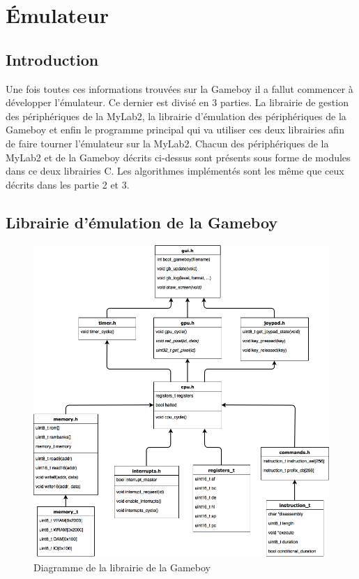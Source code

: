 \documentclass[a4paper]{article}
\begin{document}
\section{Émulateur}
\subsection{Introduction}
Une fois toutes ces informations trouvées sur la Gameboy il a fallut commencer
à développer l'émulateur. Ce dernier est divisé en 3 parties. La librairie de gestion
des périphériques de la MyLab2, la librairie d'émulation des périphériques de la Gameboy
et enfin le programme principal qui va utiliser ces deux librairies afin de faire
tourner l'émulateur sur la MyLab2. Chacun des périphériques de la MyLab2 et de la
Gameboy décrits  ci-dessus sont présents sous forme de modules dans ce deux librairies C.
Les algorithmes implémentés sont les même que ceux décrits dans les partie 2 et 3. \\


\subsection{Librairie d'émulation de la Gameboy}

\begin{figure}[!h]
  \centering
  \includegraphics[scale=0.4]{images/class_diag.png}
  \caption{Diagramme de la librairie de la Gameboy}
\end{figure}
\end{document}
